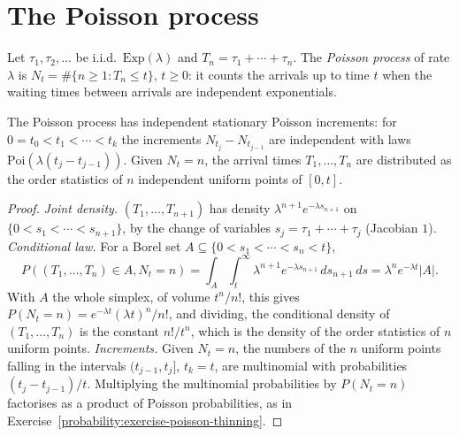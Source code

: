 \section{The Poisson process}\label{martingales:section-poisson-process}

\begin{definition}\label{martingales:definition-poisson-process}
Let $\tau_1, \tau_2, \ldots$ be i.i.d.\ $\mathrm{Exp}(\lambda)$ and $T_n = \tau_1 + \cdots + \tau_n$. The \emph{Poisson process} of rate $\lambda$ is $N_t = \#\{n \geq 1 : T_n \leq t\}$, $t \geq 0$: it counts the arrivals up to time $t$
when the waiting times between arrivals are independent exponentials.
\end{definition}

\begin{theorem}\label{martingales:theorem-poisson-process}
The Poisson process has independent stationary Poisson increments: for $0 = t_0 < t_1 < \cdots < t_k$ the increments $N_{t_j} - N_{t_{j-1}}$ are independent with laws $\mathrm{Poi}(\lambda(t_j - t_{j-1}))$. Given $N_t = n$, the
arrival times $T_1, \ldots, T_n$ are distributed as the order statistics of $n$ independent uniform points of $[0, t]$.
\end{theorem}

\begin{proof}
\emph{Joint density.} $(T_1, \ldots, T_{n+1})$ has density $\lambda^{n+1}e^{-\lambda s_{n+1}}$ on $\{0 < s_1 < \cdots < s_{n+1}\}$, by the change of variables $s_j = \tau_1 + \cdots + \tau_j$ (Jacobian $1$). \emph{Conditional law.} For a
Borel set $A \subseteq \{0 < s_1 < \cdots < s_n < t\}$,
\[
P((T_1, \ldots, T_n) \in A, N_t = n) = \int_A\int_t^\infty\lambda^{n+1}e^{-\lambda s_{n+1}}\,ds_{n+1}\,ds = \lambda^ne^{-\lambda t}|A|.
\]
With $A$ the whole simplex, of volume $t^n/n!$, this gives $P(N_t = n) = e^{-\lambda t}(\lambda t)^n/n!$, and dividing, the conditional density of $(T_1, \ldots, T_n)$ is the constant $n!/t^n$, which is the density of the order statistics
of $n$ uniform points. \emph{Increments.} Given $N_t = n$, the numbers of the $n$ uniform points falling in the intervals $(t_{j-1}, t_j]$, $t_k = t$, are multinomial with probabilities $(t_j - t_{j-1})/t$. Multiplying the multinomial
probabilities by $P(N_t = n)$ factorises as a product of Poisson probabilities, as in Exercise~\ref{probability:exercise-poisson-thinning}.
\end{proof}


